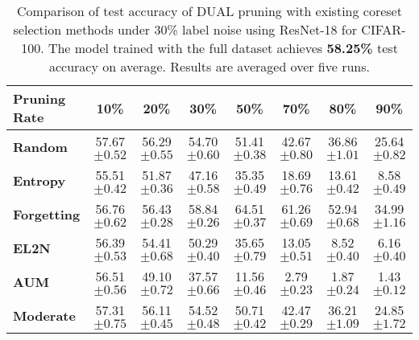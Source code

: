 \begin{table}[ht]
\caption{\label{tab:label_noise_30_cifar}Comparison of test accuracy of DUAL pruning with existing coreset selection methods under 30\% label noise using ResNet-18 for CIFAR-100. The model trained with the full dataset achieves \textbf{58.25\%} test accuracy on average. Results are averaged over five runs.}
\setlength{\tabcolsep}{3.1pt}
\centering
\begin{tabular}{lccccccc}
    \toprule
    \textbf{Pruning Rate} & \textbf{10\%} & \textbf{20\%} & \textbf{30\%} & \textbf{50\%} & \textbf{70\%} & \textbf{80\%} & \textbf{90\%} \\
    \midrule
    \textbf{Random} & 57.67 \scriptsize{$\pm 0.52 $} & 56.29 \scriptsize{$\pm 0.55 $} & 54.70 \scriptsize{$\pm 0.60 $} & 51.41 \scriptsize{$\pm 0.38 $} & 42.67 \scriptsize{$\pm 0.80 $} & 36.86 \scriptsize{$\pm 1.01 $} & 25.64 \scriptsize{$\pm 0.82 $} \\
    
    \textbf{Entropy} & 55.51 \scriptsize{$\pm 0.42 $} & 51.87 \scriptsize{$\pm 0.36 $} & 47.16 \scriptsize{$\pm 0.58 $} & 35.35 \scriptsize{$\pm 0.49 $} & 18.69 \scriptsize{$\pm 0.76 $} & 13.61 \scriptsize{$\pm 0.42$} & 8.58 \scriptsize{$\pm 0.49$}\\
    
    \textbf{Forgetting} & 56.76 \scriptsize{$\pm 0.62 $} & 56.43 \scriptsize{$\pm 0.28 $} & 58.84 \scriptsize{$\pm 0.26 $} & 64.51 \scriptsize{$\pm 0.37 $} & 61.26 \scriptsize{$\pm 0.69 $} & 52.94 \scriptsize{$\pm 0.68 $} & 34.99 \scriptsize{$\pm 1.16 $} \\
    
    \textbf{EL2N} & 56.39 \scriptsize{$\pm 0.53 $} & 54.41 \scriptsize{$\pm 0.68 $} & 50.29 \scriptsize{$\pm 0.40 $} & 35.65 \scriptsize{$\pm 0.79 $} & 13.05 \scriptsize{$\pm 0.51 $} & 8.52 \scriptsize{$\pm 0.40 $} & 6.16 \scriptsize{$\pm 0.40 $} \\
    
    \textbf{AUM} & 56.51 \scriptsize{$\pm 0.56$} & 49.10 \scriptsize{$\pm 0.72$} & 37.57 \scriptsize{$\pm 0.66$} & 11.56 \scriptsize{$\pm 0.46$}& 2.79 \scriptsize{$\pm 0.23 $} & 1.87 \scriptsize{$\pm 0.24 $} & 1.43 \scriptsize{$\pm 0.12$}\\
    
    \textbf{Moderate} & 57.31 \scriptsize{$\pm 0.75 $} & 56.11 \scriptsize{$\pm 0.45 $} & 54.52 \scriptsize{$\pm 0.48 $} & 50.71 \scriptsize{$\pm 0.42 $} & 42.47 \scriptsize{$\pm 0.29 $} & 36.21 \scriptsize{$\pm 1.09 $} & 24.85 \scriptsize{$\pm 1.72$}  \\
    

\end{tabular}
\end{table}
